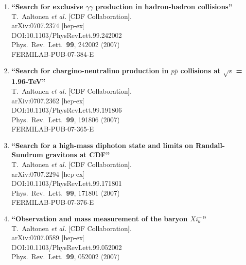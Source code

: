 \documentclass{article}
\begin{document}
\begin{enumerate}
\item%
{\bf ``Search for exclusive $\gamma \gamma$ production in hadron-hadron collisions''}
  \\{}T.~Aaltonen {\it et al.} [CDF Collaboration].
  \\{}arXiv:0707.2374 [hep-ex]
  \\{}DOI:10.1103/PhysRevLett.99.242002
  \\{}Phys.\ Rev.\ Lett.\  {\bf 99}, 242002 (2007)
  \\{}FERMILAB-PUB-07-384-E
\item%
{\bf ``Search for chargino-neutralino production in $p \bar{p}$ collisions at $\sqrt{s}$ = 1.96-TeV''}
  \\{}T.~Aaltonen {\it et al.} [CDF Collaboration].
  \\{}arXiv:0707.2362 [hep-ex]
  \\{}DOI:10.1103/PhysRevLett.99.191806
  \\{}Phys.\ Rev.\ Lett.\  {\bf 99}, 191806 (2007)
  \\{}FERMILAB-PUB-07-365-E
\item%
{\bf ``Search for a high-mass diphoton state and limits on Randall-Sundrum gravitons at CDF''}
  \\{}T.~Aaltonen {\it et al.} [CDF Collaboration].
  \\{}arXiv:0707.2294 [hep-ex]
  \\{}DOI:10.1103/PhysRevLett.99.171801
  \\{}Phys.\ Rev.\ Lett.\  {\bf 99}, 171801 (2007)
  \\{}FERMILAB-PUB-07-376-E
\item%
{\bf ``Observation and mass measurement of the baryon $Xi_b^-$''}
  \\{}T.~Aaltonen {\it et al.} [CDF Collaboration].
  \\{}arXiv:0707.0589 [hep-ex]
  \\{}DOI:10.1103/PhysRevLett.99.052002
  \\{}Phys.\ Rev.\ Lett.\  {\bf 99}, 052002 (2007)

\end{enumerate}
\end{document}
